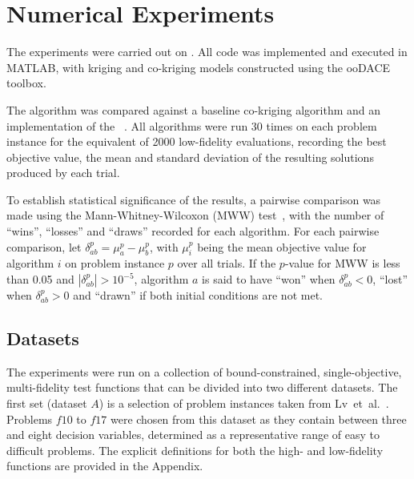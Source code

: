 \section{Numerical Experiments}\label{sec:exp}
The experiments were carried out on . All code was implemented and executed in MATLAB, with kriging and co-kriging models constructed using the ooDACE toolbox.

The \AlgName{} algorithm was compared against a baseline co-kriging algorithm and an implementation of the \motos{}~\cite{xu2016mo2tos}. All algorithms were run 30 times on each problem instance for the equivalent of 2000 low-fidelity evaluations, recording the best objective value, the mean and standard deviation of the resulting solutions produced by each trial.

To establish statistical significance of the results, a pairwise comparison was made using the Mann-Whitney-Wilcoxon (MWW) test~\cite{mann1947test}, with the number of ``wins'', ``losses'' and ``draws'' recorded for each algorithm. For each pairwise comparison, let $\delta^p_{ab} = \mu^p_a - \mu^p_b$, with $\mu^p_i$ being the mean objective value for algorithm $i$ on problem instance $p$ over all trials. If the $p$-value for MWW is less than 0.05 and $|\delta^p_{ab}| > 10^{-5}$, algorithm $a$ is said to have ``won'' when $\delta^p_{ab} < 0$, ``lost'' when $\delta^p_{ab} > 0$ and ``drawn'' if both initial conditions are not met.

\subsection{Datasets}
The experiments were run on a collection of bound-constrained, single-objective, multi-fidelity test functions that can be divided into two different datasets. The first set (dataset $A$) is a selection of problem instances taken from Lv~et~al.~\cite{lv2021multi}. Problems $f10$ to $f17$ were chosen from this dataset as they contain between three and eight decision variables, determined as a representative range of easy to difficult problems. The explicit definitions for both the high- and low-fidelity functions are provided in the Appendix.

